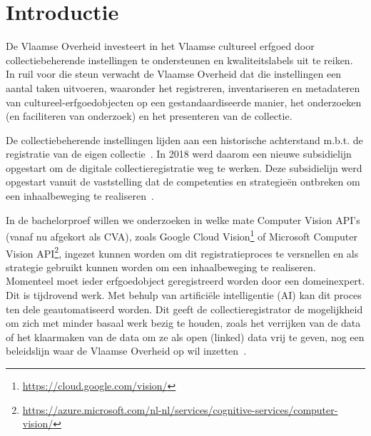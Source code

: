 \documentclass[fleqn,10pt]{voorstel}
\affiliation{\textbf{Contact:}
  \textsuperscript{1} \href{mailto:jens.buysse@hogent.be}{nastasia.vanderperren.v8632@student.hogent.be}}
\begin{document}
\flushbottom %
\maketitle %
\tableofcontents %
\thispagestyle{empty} %



\section{Introductie} %
\label{sec:introductie}

De Vlaamse Overheid investeert in het Vlaamse cultureel erfgoed door collectiebeherende instellingen te ondersteunen en kwaliteitslabels uit te reiken. In ruil voor die steun verwacht de Vlaamse Overheid dat die instellingen een aantal taken uitvoeren, waaronder het registreren, inventariseren en metadateren van cultureel-erfgoedobjecten op een gestandaardiseerde manier, het onderzoeken (en faciliteren van onderzoek) en het presenteren van de collectie.~\autocites{AKE2014}{Gatz2016}

De collectiebeherende instellingen lijden aan een historische achterstand m.b.t. de registratie van de eigen collectie~\autocite{Gatz2016}. In 2018 werd daarom een nieuwe subsidielijn opgestart om de digitale collectieregistratie weg te werken. Deze subsidielijn werd opgestart vanuit de vaststelling dat de competenties en strategieën ontbreken om een inhaalbeweging te realiseren~\autocite{JeugdMediaC2018a}.

In de bachelorproef willen we onderzoeken in welke mate Computer Vision API's (vanaf nu afgekort als CVA), zoals Google Cloud Vision\footnote{\url{https://cloud.google.com/vision/}} of Microsoft Computer Vision API\footnote{\url{https://azure.microsoft.com/nl-nl/services/cognitive-services/computer-vision/}}, ingezet kunnen worden om dit registratieproces te versnellen en als strategie gebruikt kunnen worden om een inhaalbeweging te realiseren. Momenteel moet ieder erfgoedobject geregistreerd worden door een domeinexpert. Dit is tijdrovend werk. Met behulp van artificiële intelligentie (AI) kan dit proces ten dele geautomatiseerd worden. Dit geeft de collectieregistrator de mogelijkheid om zich met minder basaal werk bezig te houden, zoals het verrijken van de data of het klaarmaken van de data om ze als open (linked) data vrij te geven, nog een beleidslijn waar de Vlaamse Overheid op wil inzetten~\autocite{JeugdMediaC2018}. 
\end{document}
